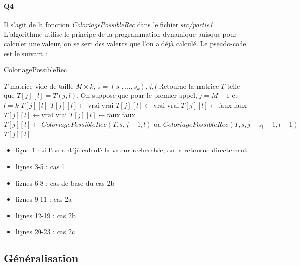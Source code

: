 \documentclass[12pt]{article}
\newcommand{\true}{\text{vrai}}
\newcommand{\false}{\text{faux}}
\begin{document}
			\paragraph{Q4}
				Il s'agit de la fonction \textit{ColoriagePossibleRec} dans le fichier \textit{src/partie1}. L'algorithme utilise le principe de la programmation dynamique puisque pour calculer une valeur, on se sert des valeurs que l'on a déjà calculé. Le pseudo-code est le suivant :
				\begin{algorithm} [H]
					\caption{ColoriagePossibleRec}
					\label{color_poss_rec}
					\begin{algorithmic}[1]
						\REQUIRE $T$ matrice vide de taille $ M \times k $, $ s=(s_1,...,s_k), j, l$ 
						\ENSURE Retourne la matrice $ T $ telle que $ T[j][l] = T(j,l) $. On suppose que pour le premier appel, $ j = M-1 $ et $ l = k $
						\RETURN $ T[j][l] $
						\STATE $ T[j][l] \leftarrow \true $
						\RETURN $ \true $
						\STATE $ T[j][l] \leftarrow \true $
						\RETURN $ \true $
						\STATE $ T[j][l] \leftarrow \false $
						\RETURN faux
						\STATE $ T[j][l] \leftarrow \true $
						\RETURN vrai
						\ELSE
						\STATE$ T[j][l] \leftarrow \false $
						\RETURN faux
						\ENDIF
						\ELSE
						\STATE $ T[j][l] \leftarrow ColoriagePossibleRec(T,s,j-1,l) \text{ ou } ColoriagePossibleRec(T,s,j-s_l-1,l-1) $
						\RETURN $ T[j][l] $
						\ENDIF\begin{flushleft}
							
						\end{flushleft}
					\end{algorithmic}
				\end{algorithm}
				
				\begin{itemize}
					\item ligne 1 : si  l'on a déjà calculé la valeur recherchée, on la retourne directement
					\item lignes 3-5 : cas 1
					\item lignes 6-8 : cas de base du cas 2b
					\item lignes 9-11 : cas 2a
					\item lignes 12-19 : cas 2b
					\item lignes 20-23 : cas 2c
				\end{itemize}
	
		\subsection{Généralisation}
		
\end{document}
